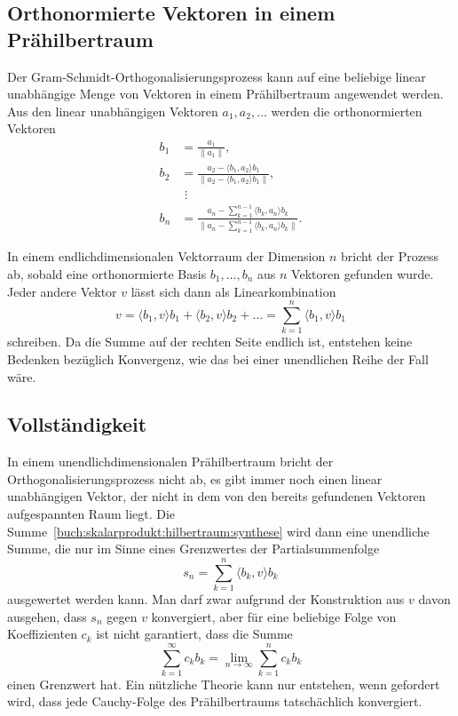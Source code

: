 \subsection{Orthonormierte Vektoren in einem Prähilbertraum}
Der Gram-Schmidt-Orthogonalisierungsprozess kann auf eine beliebige
%
linear unabhängige Menge von Vektoren in einem Prähilbertraum angewendet
werden.
Aus den linear unabhängigen Vektoren $a_1,a_2,\dots$ werden die
orthonormierten Vektoren
\begin{align*}
b_1
&=
\frac{a_1}{\|a_1\|},
\\
b_2
&=
\frac{
a_2 - \langle b_1,a_2\rangle b_1
}{
\|a_2 - \langle b_1,a_2\rangle b_1\|
},
\\
&\phantom{i}\vdots
\\
b_n
&=
\frac{\displaystyle
a_n - \sum_{k=1}^{n-1} \langle b_k,a_n\rangle b_k
}{\displaystyle
\biggl\|a_n - \sum_{k=1}^{n-1} \langle b_k,a_n\rangle b_k\biggr\|
}.
\end{align*}

In einem endlichdimensionalen Vektorraum der Dimension $n$ bricht
der Prozess ab, sobald eine orthonormierte Basis $b_1,\dots,b_n$
aus $n$ Vektoren gefunden wurde.
Jeder andere Vektor $v$ lässt sich dann als Linearkombination
\begin{equation}
v
=
\langle b_1,v\rangle b_1 + \langle b_2,v\rangle b_2 + \dots
=
\sum_{k=1}^n \langle b_1,v\rangle b_1
\label{buch:skalarprodukt:hilbertraum:synthese}
\end{equation}
schreiben.
Da die Summe auf der rechten Seite endlich ist, entstehen keine
Bedenken bezüglich Konvergenz, wie das bei einer unendlichen
Reihe der Fall wäre.

%
%
\subsection{Vollständigkeit}
In einem unendlichdimensionalen Prähilbertraum bricht der
Orthogonalisierungsprozess nicht ab, es gibt immer noch einen
linear unabhängigen Vektor, der nicht in dem von den bereits
gefundenen Vektoren aufgespannten Raum liegt.
Die Summe~\ref{buch:skalarprodukt:hilbertraum:synthese} wird dann
eine unendliche Summe, die nur im Sinne eines Grenzwertes der
Partialsummenfolge
\begin{equation*}
s_n = \sum_{k=1}^n \langle b_k,v\rangle b_k
\end{equation*}
ausgewertet werden kann.
Man darf zwar aufgrund der Konstruktion aus $v$ davon ausgehen,
dass $s_n$ gegen $v$ konvergiert,
aber für eine beliebige Folge von Koeffizienten $c_k$ ist nicht
garantiert, dass die Summe
\[
\sum_{k=1}^\infty c_kb_k
=
\lim_{n\to\infty} \sum_{k=1}^n c_kb_k
\]
einen Grenzwert hat.
Ein nützliche Theorie kann nur entstehen, wenn gefordert wird,
dass jede Cauchy-Folge des Prähilbertraums tatschächlich konvergiert.

